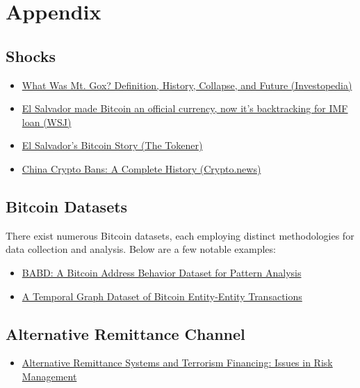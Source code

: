 \documentclass[
  11pt,
]{article}
\providecommand{\tightlist}{%
  \setlength{\itemsep}{0pt}\setlength{\parskip}{0pt}}\usepackage{longtable,booktabs,array}
\begin{document}
\section{Appendix}\label{appendix}

\subsection{Shocks}\label{shocks-1}

\begin{itemize}
\tightlist
\item
  \href{https://www.investopedia.com/terms/m/mt-gox.asp}{What Was Mt.
  Gox? Definition, History, Collapse, and Future (Investopedia)}
\item
  \href{https://www.wsj.com/world/americas/el-salvador-made-bitcoin-an-official-currency-now-its-backtracking-for-imf-loan-874c6623}{El
  Salvador made Bitcoin an official currency, now it's backtracking for
  IMF loan (WSJ)}
\item
  \href{https://thetokener.com/learn/el-salvadors-bitcoin-story/}{El
  Salvador's Bitcoin Story (The Tokener)}
\item
  \href{https://crypto.news/china-crypto-bans-a-complete-history/}{China
  Crypto Bans: A Complete History (Crypto.news)}
\end{itemize}

\subsection{Bitcoin Datasets}\label{bitcoin-datasets}

There exist numerous Bitcoin datasets, each employing distinct
methodologies for data collection and analysis. Below are a few notable
examples:

\begin{itemize}
\tightlist
\item
  \href{https://arxiv.org/abs/2204.05746?utm_source}{BABD: A Bitcoin
  Address Behavior Dataset for Pattern Analysis}
\item
  \href{https://www.nature.com/articles/s41597-025-04595-8}{A Temporal
  Graph Dataset of Bitcoin Entity-Entity Transactions}
\end{itemize}

\subsection{Alternative Remittance
Channel}\label{alternative-remittance-channel}

\begin{itemize}
\tightlist
\item
  \href{https://www.econstor.eu/bitstream/10419/204586/1/1678825786.pdf}{Alternative
  Remittance Systems and Terrorism Financing: Issues in Risk Management}
\end{itemize}


\printbibliography
\end{document}
